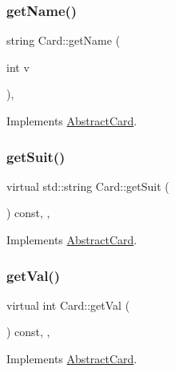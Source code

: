 \subsubsection{\texorpdfstring{get\+Name()}{getName()}}
{\footnotesize\ttfamily string Card\+::get\+Name (\begin{DoxyParamCaption}\item[{int}]{v }\end{DoxyParamCaption})\hspace{0.3cm}{\ttfamily [override]}, {\ttfamily [virtual]}}



Implements \mbox{\hyperlink{class_abstract_card}{Abstract\+Card}}.

\mbox{\label{class_card_aab1167b9d62b97601624f5c3bef55e8f}} 
\subsubsection{\texorpdfstring{get\+Suit()}{getSuit()}}
{\footnotesize\ttfamily virtual std\+::string Card\+::get\+Suit (\begin{DoxyParamCaption}{ }\end{DoxyParamCaption}) const\hspace{0.3cm}{\ttfamily [inline]}, {\ttfamily [override]}, {\ttfamily [virtual]}}



Implements \mbox{\hyperlink{class_abstract_card}{Abstract\+Card}}.

\mbox{\label{class_card_ae413a3c5a9bcd7bb320a1e7dc6c10f08}} 
\subsubsection{\texorpdfstring{get\+Val()}{getVal()}}
{\footnotesize\ttfamily virtual int Card\+::get\+Val (\begin{DoxyParamCaption}{ }\end{DoxyParamCaption}) const\hspace{0.3cm}{\ttfamily [inline]}, {\ttfamily [override]}, {\ttfamily [virtual]}}



Implements \mbox{\hyperlink{class_abstract_card}{Abstract\+Card}}.

\mbox{\label{class_card_aa82800b9e7be48b843e93e113f2472ef}} 
